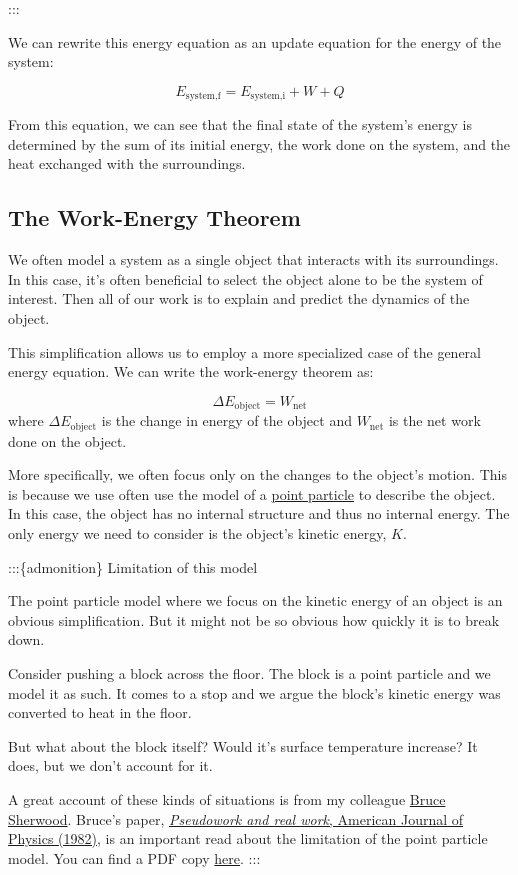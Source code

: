 \documentclass[11pt]{article}
\begin{document}
:::

We can rewrite this energy equation as an update equation for the energy
of the system:

\[E_{\text{system,f}} = E_{\text{system,i}} + W + Q\]

From this equation, we can see that the final state of the system's
energy is determined by the sum of its initial energy, the work done on
the system, and the heat exchanged with the surroundings.

    \subsection{The Work-Energy Theorem}\label{the-work-energy-theorem}

We often model a system as a single object that interacts with its
surroundings. In this case, it's often beneficial to select the object
alone to be the system of interest. Then all of our work is to explain
and predict the dynamics of the object.

This simplification allows us to employ a more specialized case of the
general energy equation. We can write the work-energy theorem as:

\[\Delta E_{\text{object}} = W_{\text{net}}\] where
\(\Delta E_{\text{object}}\) is the change in energy of the object and
\(W_{\text{net}}\) is the net work done on the object.

More specifically, we often focus only on the changes to the object's
motion. This is because we use often use the model of a
\href{https://en.wikipedia.org/wiki/Point_particle}{point particle} to
describe the object. In this case, the object has no internal structure
and thus no internal energy. The only energy we need to consider is the
object's kinetic energy, \(K\).

:::\{admonition\} Limitation of this model

The point particle model where we focus on the kinetic energy of an
object is an obvious simplification. But it might not be so obvious how
quickly it is to break down.

Consider pushing a block across the floor. The block is a point particle
and we model it as such. It comes to a stop and we argue the block's
kinetic energy was converted to heat in the floor.

But what about the block itself? Would it's surface temperature
increase? It does, but we don't account for it.

A great account of these kinds of situations is from my colleague
\href{https:/brucesherwood.net/}{Bruce Sherwood}. Bruce's paper,
\href{https://pubs.aip.org/aapt/ajp/article-abstract/51/7/597/1052185/Pseudowork-and-real-work?redirectedFrom=fulltext}{\emph{Pseudowork
and real work}, American Journal of Physics (1982)}, is an important
read about the limitation of the point particle model. You can find a
PDF copy
\href{https://brucesherwood.net/wp-content/uploads/2017/06/Pseudowork1983.pdf}{here}.
:::
\end{document}
